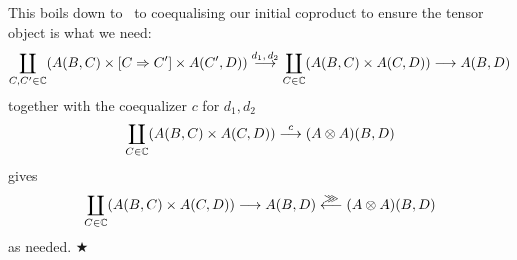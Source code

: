 This boils down to~\cite[p.~10]{arr-like-mon} to coequalising our initial
coproduct to ensure the tensor object is what we need:
\[ \coprod_{C, C' \in \mathbb{C}} (A(B, C) \times [C \Rightarrow C'] \times A(C', D))
    \overset{d_1,\, d_2 }{\longrightarrow}
    \coprod_{C \in \mathbb{C}} (A(B, C) \times A(C, D))
    \longrightarrow
    A(B, D)
\]
together with the coequalizer $c$ for $d_1, d_2$
\[ \coprod_{C \in \mathbb{C}} (A(B, C) \times A(C, D))
    \overset{c}{\longrightarrow}
    (A \otimes A)(B, D)
\]
gives
\[ \coprod_{C \in \mathbb{C}} (A(B, C) \times A(C, D)) \longrightarrow A(B, D)
    \overset{\ggg}{\longleftarrow}
    (A \otimes A)(B, D)
\]
as needed. $\bigstar$
